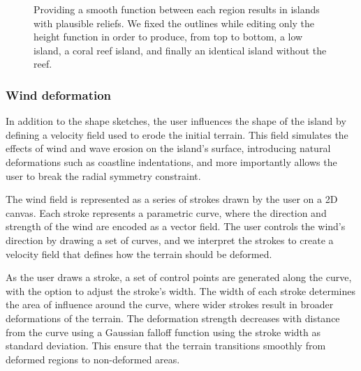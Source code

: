 \begin{figure}
    \caption{Providing a smooth function between each region results in islands with plausible reliefs. We fixed the outlines while editing only the height function in order to produce, from top to bottom, a low island, a coral reef island, and finally an identical island without the reef.}
    \label{fig:coral-island-procedural-smooth-heights}
\end{figure}

\subsubsection{Wind deformation}
\label{sec:coral-island-wind-deformation}


In addition to the shape sketches, the user influences the shape of the island by defining a velocity field used to erode the initial terrain. This field simulates the effects of wind and wave erosion on the island's surface, introducing natural deformations such as coastline indentations, and more importantly allows the user to break the radial symmetry constraint.

The wind field is represented as a series of strokes drawn by the user on a 2D canvas. Each stroke represents a parametric curve, where the direction and strength of the wind are encoded as a vector field. The user controls the wind's direction by drawing a set of curves, and we interpret the strokes to create a velocity field that defines how the terrain should be deformed.

As the user draws a stroke, a set of control points are generated along the curve, with the option to adjust the stroke's width. The width of each stroke determines the area of influence around the curve, where wider strokes result in broader deformations of the terrain.
The deformation strength decreases with distance from the curve using a Gaussian falloff function using the stroke width as standard deviation. This ensure that the terrain transitions smoothly from deformed regions to non-deformed areas.

